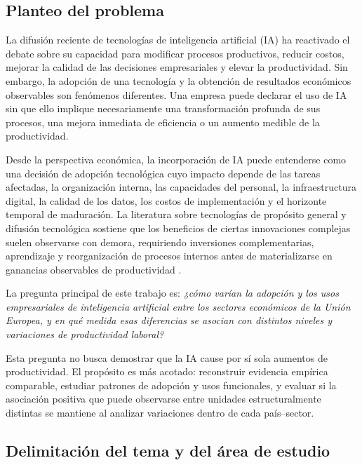 \documentclass[12pt,a4paper]{article}
\begin{document}
\subsection{Planteo del problema}

La difusión reciente de tecnologías de inteligencia artificial (IA) ha reactivado el debate sobre su capacidad para modificar procesos productivos, reducir costos, mejorar la calidad de las decisiones empresariales y elevar la productividad. Sin embargo, la adopción de una tecnología y la obtención de resultados económicos observables son fenómenos diferentes. Una empresa puede declarar el uso de IA sin que ello implique necesariamente una transformación profunda de sus procesos, una mejora inmediata de eficiencia o un aumento medible de la productividad.

Desde la perspectiva económica, la incorporación de IA puede entenderse como una decisión de adopción tecnológica cuyo impacto depende de las tareas afectadas, la organización interna, las capacidades del personal, la infraestructura digital, la calidad de los datos, los costos de implementación y el horizonte temporal de maduración. La literatura sobre tecnologías de propósito general y difusión tecnológica sostiene que los beneficios de ciertas innovaciones complejas suelen observarse con demora, requiriendo inversiones complementarias, aprendizaje y reorganización de procesos internos antes de materializarse en ganancias observables de productividad \citep{bresnahan2002information, brynjolfsson2021productivity}.

La pregunta principal de este trabajo es: \textit{¿cómo varían la adopción y los usos empresariales de inteligencia artificial entre los sectores económicos de la Unión Europea, y en qué medida esas diferencias se asocian con distintos niveles y variaciones de productividad laboral?}

Esta pregunta no busca demostrar que la IA cause por sí sola aumentos de productividad. El propósito es más acotado: reconstruir evidencia empírica comparable, estudiar patrones de adopción y usos funcionales, y evaluar si la asociación positiva que puede observarse entre unidades estructuralmente distintas se mantiene al analizar variaciones dentro de cada país--sector.

\subsection{Delimitación del tema y del área de estudio}
\end{document}
